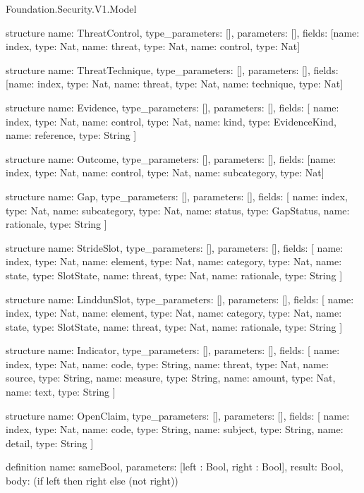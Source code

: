 \begin{lexlean}{Foundation.Security.V1.Model}
\begin{semanticmodule}
structure{
  name: ThreatControl,
  type_parameters: [],
  parameters: [],
  fields: [{name: index, type: Nat}, {name: threat, type: Nat}, {name: control, type: Nat}]
}

structure{
  name: ThreatTechnique,
  type_parameters: [],
  parameters: [],
  fields: [{name: index, type: Nat}, {name: threat, type: Nat}, {name: technique, type: Nat}]
}

structure{
  name: Evidence,
  type_parameters: [],
  parameters: [],
  fields: [
    {name: index, type: Nat},
    {name: control, type: Nat},
    {name: kind, type: EvidenceKind},
    {name: reference, type: String}
  ]
}

structure{
  name: Outcome,
  type_parameters: [],
  parameters: [],
  fields: [{name: index, type: Nat}, {name: control, type: Nat}, {name: subcategory, type: Nat}]
}

structure{
  name: Gap,
  type_parameters: [],
  parameters: [],
  fields: [
    {name: index, type: Nat},
    {name: subcategory, type: Nat},
    {name: status, type: GapStatus},
    {name: rationale, type: String}
  ]
}

structure{
  name: StrideSlot,
  type_parameters: [],
  parameters: [],
  fields: [
    {name: index, type: Nat},
    {name: element, type: Nat},
    {name: category, type: Nat},
    {name: state, type: SlotState},
    {name: threat, type: Nat},
    {name: rationale, type: String}
  ]
}

structure{
  name: LinddunSlot,
  type_parameters: [],
  parameters: [],
  fields: [
    {name: index, type: Nat},
    {name: element, type: Nat},
    {name: category, type: Nat},
    {name: state, type: SlotState},
    {name: threat, type: Nat},
    {name: rationale, type: String}
  ]
}

structure{
  name: Indicator,
  type_parameters: [],
  parameters: [],
  fields: [
    {name: index, type: Nat},
    {name: code, type: String},
    {name: threat, type: Nat},
    {name: source, type: String},
    {name: measure, type: String},
    {name: amount, type: Nat},
    {name: text, type: String}
  ]
}

structure{
  name: OpenClaim,
  type_parameters: [],
  parameters: [],
  fields: [
    {name: index, type: Nat},
    {name: code, type: String},
    {name: subject, type: String},
    {name: detail, type: String}
  ]
}

definition{
  name: sameBool,
  parameters: [left : Bool, right : Bool],
  result: Bool,
  body: (if left then right else (not right))
}


\end{semanticmodule}
\end{lexlean}
